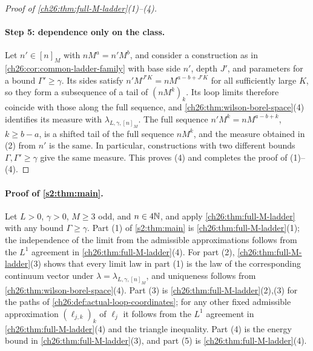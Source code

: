 \begin{proof}[Proof of \cref{ch26:thm:full-M-ladder}(1)--(4)]
\paragraph{Step 5: dependence only on the class.}
Let $n'\in[n]_M$ with $nM^a=n'M^b$, and consider a construction as in \cref{ch26:cor:common-ladder-family} with base side $n'$, depth $J'$, and parameters for a bound $\Gamma'\ge\gamma$. Its sides satisfy $n'M^{J'K}=nM^{a-b+J'K}$ for all sufficiently large $K$, so they form a subsequence of a tail of $(nM^k)_k$. Its loop limits therefore coincide with those along the full sequence, and \cref{ch26:thm:wilson-borel-space}(4) identifies its measure with $\lambda_{L,\gamma,[n]_M}$. The full sequence $n'M^k=nM^{a-b+k}$, $k\ge b-a$, is a shifted tail of the full sequence $nM^k$, and the measure obtained in (2) from $n'$ is the same. In particular, constructions with two different bounds $\Gamma,\Gamma'\ge\gamma$ give the same measure. This proves (4) and completes the proof of (1)--(4).
\end{proof}

\paragraph{Proof of \cref{s2:thm:main}.}
Let $L>0$, $\gamma>0$, $M\ge3$ odd, and $n\in4\mathbb N$, and apply \cref{ch26:thm:full-M-ladder} with any bound $\Gamma\ge\gamma$. Part (1) of \cref{s2:thm:main} is \cref{ch26:thm:full-M-ladder}(1); the independence of the limit from the admissible approximations follows from the $L^1$ agreement in \cref{ch26:thm:full-M-ladder}(4). For part (2), \cref{ch26:thm:full-M-ladder}(3) shows that every limit law in part (1) is the law of the corresponding continuum vector under $\lambda=\lambda_{L,\gamma,[n]_M}$, and uniqueness follows from \cref{ch26:thm:wilson-borel-space}(4). Part (3) is \cref{ch26:thm:full-M-ladder}(2),(3) for the paths of \cref{ch26:def:actual-loop-coordinates}; for any other fixed admissible approximation $(\ell_{j,k})_k$ of $\ell_j$ it follows from the $L^1$ agreement in \cref{ch26:thm:full-M-ladder}(4) and the triangle inequality. Part (4) is the energy bound in \cref{ch26:thm:full-M-ladder}(3), and part (5) is \cref{ch26:thm:full-M-ladder}(4).
